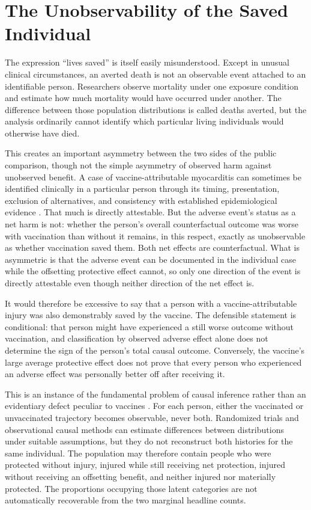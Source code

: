 \documentclass[11pt]{article}
\begin{document}
\section{The Unobservability of the Saved Individual}

The expression ``lives saved'' is itself easily misunderstood. Except in unusual clinical circumstances, an averted death is not an observable event attached to an identifiable person. Researchers observe mortality under one exposure condition and estimate how much mortality would have occurred under another. The difference between those population distributions is called deaths averted, but the analysis ordinarily cannot identify which particular living individuals would otherwise have died.

This creates an important asymmetry between the two sides of the public comparison, though not the simple asymmetry of observed harm against unobserved benefit. A case of vaccine-attributable myocarditis can sometimes be identified clinically in a particular person through its timing, presentation, exclusion of alternatives, and consistency with established epidemiological evidence \citep{nasem2024}. That much is directly attestable. But the adverse event's status as a net harm is not: whether the person's overall counterfactual outcome was worse with vaccination than without it remains, in this respect, exactly as unobservable as whether vaccination saved them. Both net effects are counterfactual. What is asymmetric is that the adverse event can be documented in the individual case while the offsetting protective effect cannot, so only one direction of the event is directly attestable even though neither direction of the net effect is.

It would therefore be excessive to say that a person with a vaccine-attributable injury was also demonstrably saved by the vaccine. The defensible statement is conditional: that person might have experienced a still worse outcome without vaccination, and classification by observed adverse effect alone does not determine the sign of the person's total causal outcome. Conversely, the vaccine's large average protective effect does not prove that every person who experienced an adverse effect was personally better off after receiving it.

This is an instance of the fundamental problem of causal inference rather than an evidentiary defect peculiar to vaccines \citep{holland1986}. For each person, either the vaccinated or unvaccinated trajectory becomes observable, never both. Randomized trials and observational causal methods can estimate differences between distributions under suitable assumptions, but they do not reconstruct both histories for the same individual. The population may therefore contain people who were protected without injury, injured while still receiving net protection, injured without receiving an offsetting benefit, and neither injured nor materially protected. The proportions occupying those latent categories are not automatically recoverable from the two marginal headline counts.
\end{document}
